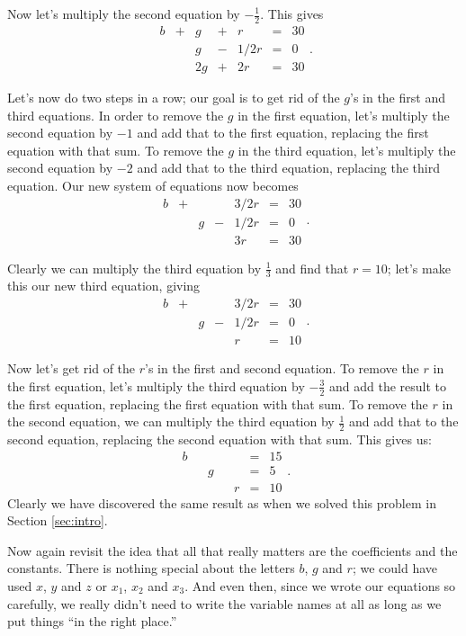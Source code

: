Now let's multiply the second equation by $-\frac12$. This gives 
\[
\begin{array}{ccccccc}
b&+&g&+&r&=&30\\
 & & g&-&1/2r&=&0\\
 & &2g&+&2r&=&30
\end{array}.
\]

Let's now do two steps in a row; our goal is to get rid of the $g$'s in the first and third equations. In order to remove the $g$ in the first equation, let's multiply the second equation by $-1$ and add that to the first equation, replacing the first equation with that sum. To remove the $g$ in the third equation, let's multiply the second equation by $-2$ and add that to the third equation, replacing the third equation. Our new system of equations now becomes
\[
\begin{array}{ccccccc}
b&+& & &3/2r&=&30\\
 & &g&-&1/2r&=&0\\
 & & & &3r&=&30
\end{array}.
\]

Clearly we can multiply the third equation by $\frac13$ and find that $r=10$; let's make this our new third equation, giving
\[
\begin{array}{ccccccc}
b&+& & &3/2r&=&30\\
 & &g&-&1/2r&=&0\\
 & & & &r&=&10
\end{array}.
\]

Now let's get rid of the $r$'s in the first and second equation. To remove the $r$ in the first equation, let's multiply the third equation by $-\frac32$ and add the result to the first equation, replacing the first equation with that sum. To remove the $r$ in the second equation, we can multiply the third equation by $\frac12$ and add that to the second equation, replacing the second equation with that sum. This gives us:
\[
\begin{array}{ccccccc}
b& & & & &=&15\\
 & &g& & &=&5\\
 & & & &r&=&10
\end{array}.
\]
Clearly we have discovered the same result as when we solved this problem in Section \ref{sec:intro}. 

Now again revisit the idea that all that really matters are the coefficients and the constants. There is nothing special about the letters $b$, $g$ and $r$; we could have used $x$, $y$ and $z$ or $x_1$, $x_2$ and $x_3$. And even then, since we wrote our equations so carefully, we really didn't need to write the variable names at all as long as we put things ``in the right place.''

